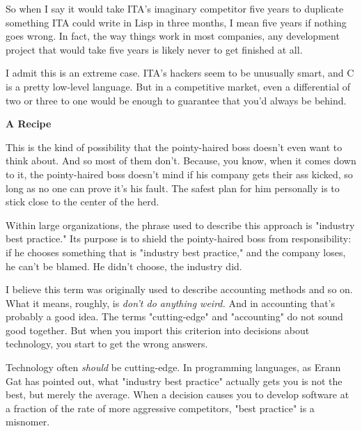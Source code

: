 So when I say it would take ITA's
                  imaginary competitor five years to duplicate something ITA
                  could write in Lisp in three months, I mean five years if
                  nothing goes wrong. In fact, the way things work in most
                  companies, any development project that would take five years
                  is likely never to get finished at all.

I admit
                  this is an extreme case. ITA's hackers seem to be unusually
                  smart, and C is a pretty low-level language. But in a
                  competitive market, even a differential of two or three to one
                  would be enough to guarantee that you'd always be behind.

\textbf{A Recipe}

This is the kind of possibility that the
                  pointy-haired boss doesn't even want to think about. And so
                  most of them don't. Because, you know, when it comes down to
                  it, the pointy-haired boss doesn't mind if his company gets
                  their ass kicked, so long as no one can prove it's his fault.
                  The safest plan for him personally is to stick close to the
                  center of the herd.

Within large organizations, the
                  phrase used to describe this approach is "industry best
                  practice." Its purpose is to shield the pointy-haired boss
                  from responsibility: if he chooses something that is "industry
                  best practice," and the company loses, he can't be blamed. He
                  didn't choose, the industry did.

I believe this
                  term was originally used to describe accounting methods and so
                  on. What it means, roughly, is
                  \emph{don't do anything weird.} And in accounting that's
                  probably a good idea. The terms "cutting-edge" and
                  "accounting" do not sound good together. But when you import
                  this criterion into decisions about technology, you start to
                  get the wrong answers.

Technology often
                  \emph{should} be cutting-edge. In programming languages, as
                  Erann Gat has pointed out, what "industry best practice"
                  actually gets you is not the best, but merely the average.
                  When a decision causes you to develop software at a fraction
                  of the rate of more aggressive competitors, "best practice" is
                  a misnomer.


